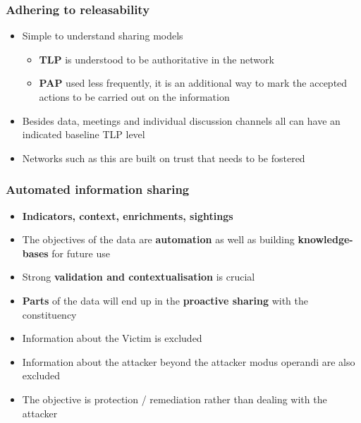 \begin{frame}
    \frametitle{Adhering to releasability}
    \begin{itemize}
        \item Simple to understand sharing models
        \begin{itemize}
            \item {\bf TLP} is understood to be authoritative in the network
            \item {\bf PAP} used less frequently, it is an additional way to mark the accepted actions to be carried out on the information
        \end{itemize}
        \item Besides data, meetings and individual discussion channels all can have an indicated baseline TLP level
        \item Networks such as this are built on trust that needs to be fostered
    \end{itemize}

\end{frame}

\begin{frame}
    \frametitle{Automated information sharing}
    \begin{itemize}
        \item {\bf Indicators, context, enrichments, sightings}
        \item The objectives of the data are {\bf automation} as well as building {\bf knowledge-bases} for future use
        \item Strong {\bf validation and contextualisation} is crucial
        \item {\bf Parts} of the data will end up in the {\bf proactive sharing} with the constituency
        \item Information about the Victim is excluded
        \item Information about the attacker beyond the attacker modus operandi are also excluded
        \item The objective is protection / remediation rather than dealing with the attacker
    \end{itemize}

\end{frame}

